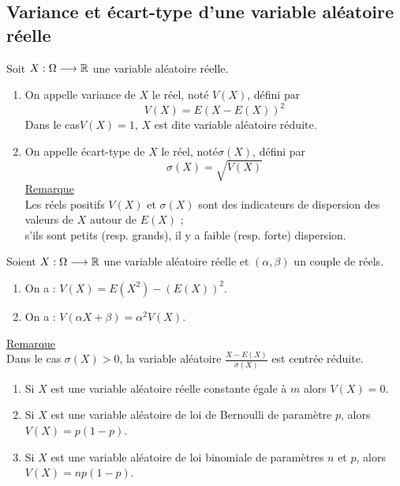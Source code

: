 \subsection{Variance et écart-type d’une variable aléatoire réelle}
\begin{defi}
    Soit \(X : \Omega \longrightarrow \mathbb{R}\) une variable aléatoire réelle.
    \begin{enumerate}
        \item On appelle variance de \(X\) le réel, noté \(V(X)\), défini par
            \[V (X) = E (X - E(X))^2\]
            Dans le cas\( V(X) = 1\), \(X\) est dite variable aléatoire réduite.
        \item On appelle écart-type de \(X\) le réel, noté\( \sigma (X)\), défini par
            \[\sigma (X) = \sqrt{V(X)}\]
    \underline{Remarque}\\
        Les réels positifs \(V(X)\) et \(\sigma (X)\) sont des indicateurs de dispersion des valeurs de \(X\) autour de \(E(X)\) ;\\
        s’ils sont petits (resp. grands), il y a faible (resp. forte) dispersion.
    \end{enumerate}
\end{defi}
\begin{prop}
    Soient \(X : \Omega \longrightarrow \mathbb{R}\) une variable aléatoire réelle et \((\alpha , \beta )\) un couple de réels.
    \begin{enumerate}
        \item On a : \(V(X) = E(X^2) - (E(X))^2\).
        \item On a : \(V(\alpha X + \beta ) = \alpha^2 V(X)\).
    \end{enumerate}
    \underline{Remarque}\\
    Dans le cas \(\sigma (X) > 0\), la variable aléatoire \(\frac{X - E(X)}{\sigma (X)}\) est centrée réduite.
\end{prop}
\begin{defprop}
    \begin{enumerate}
        \item Si \(X\) est une variable aléatoire réelle constante égale à \(m\) alors \(V(X) = 0\).
        \item Si \(X\) est une variable aléatoire de loi de Bernoulli de paramètre \(p\), alors \(V(X) = p(1 - p)\).
        \item Si \(X\) est une variable aléatoire de loi binomiale de paramètres \(n\) et \(p\), alors \(V(X) = np(1 - p)\).
    \end{enumerate}
\end{defprop}
